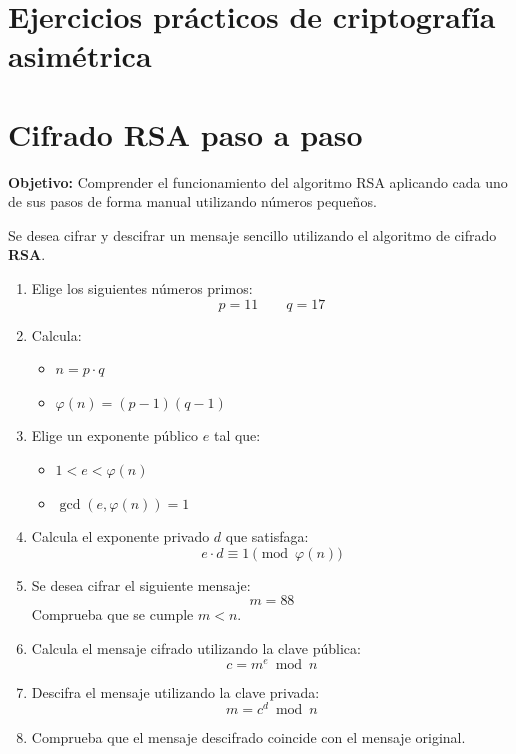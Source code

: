 \documentclass{article}
\begin{document}
\section*{Ejercicios prácticos de criptografía asimétrica}

\section{Cifrado RSA paso a paso}

\textbf{Objetivo:} Comprender el funcionamiento del algoritmo RSA aplicando cada uno de sus pasos de forma manual utilizando números pequeños.

\bigskip

Se desea cifrar y descifrar un mensaje sencillo utilizando el algoritmo de cifrado \textbf{RSA}.

\begin{enumerate}
    \item Elige los siguientes números primos:
    \[
    p = 11 \qquad q = 17
    \]

    \item Calcula:
    \begin{itemize}
        \item \( n = p \cdot q \)
        \item \( \varphi(n) = (p-1)(q-1) \)
    \end{itemize}

    \item Elige un exponente público \( e \) tal que:
    \begin{itemize}
        \item \( 1 < e < \varphi(n) \)
        \item \( \gcd(e, \varphi(n)) = 1 \)
    \end{itemize}

    \item Calcula el exponente privado \( d \) que satisfaga:
    \[
    e \cdot d \equiv 1 \pmod{\varphi(n)}
    \]

    \item Se desea cifrar el siguiente mensaje:
    \[
    m = 88
    \]
    Comprueba que se cumple \( m < n \).

    \item Calcula el mensaje cifrado utilizando la clave pública:
    \[
    c = m^e \bmod n
    \]

    \item Descifra el mensaje utilizando la clave privada:
    \[
    m = c^d \bmod n
    \]

    \item Comprueba que el mensaje descifrado coincide con el mensaje original.
\end{enumerate}
\end{document}
